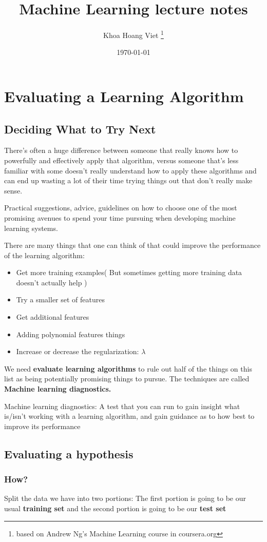\documentclass{article}
\title{Machine Learning lecture notes}
\author{Khoa Hoang Viet \thanks{based on Andrew Ng's Machine Learning course in coursera.org}}
\date{\today}
\begin{document}
\section{Evaluating a Learning Algorithm}
\subsection{Deciding What to Try Next}
There's often a huge difference between someone that really knows how to powerfully and effectively apply that algorithm, versus someone that's less familiar with some  doesn't really understand how to apply these algorithms and can end up wasting a lot of their time trying things out that don't really make sense.

Practical suggestions, advice, guidelines on how to choose one of the most promising avenues to spend your time pursuing when developing machine learning systems.

There are many things that one can think of that could improve the performance of the learning algorithm:
\begin{itemize}
	\item Get more training examples( But sometimes getting more training data doesn't actually help )
	\item Try a smaller set of features
	\item Get additional features
	\item Adding polynomial features things
	\item Increase or decrease the regularization: $\lambda$
\end{itemize}

We need \textbf{evaluate learning algorithms} to rule out half of the things on this list as being potentially promising things to pursue. The techniques are called \textbf{Machine learning diagnostics.}

Machine learning diagnostics: A test that you can run to gain insight what is/isn’t working with a learning algorithm, and gain guidance as to how best to improve its performance

\subsection{Evaluating a hypothesis}
\subsubsection{How?}
Split the data we have into two portions: The first portion is going to be our usual \textbf{training set} and the second portion is going to be our \textbf{test set}
\end{document}
